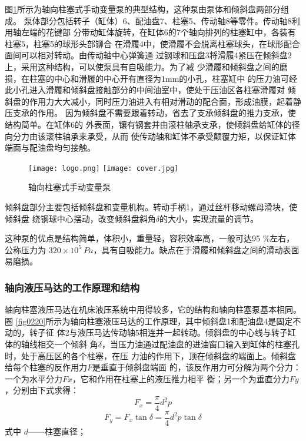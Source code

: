 图\ref{fig0219}所示为轴向柱塞式手动变量泵的典型结构，这种泵由泵体和倾斜盘两部分组成。
泵体部分包括转子（缸体）6、配油盘7、柱塞5、传动轴8等零件。传动轴8利用轴左端的花键部
分带动缸体旋转，在缸体6的7个轴向排列的柱塞缸中，各装有柱塞5，柱塞5的球形头部铆合
在滑履4中，使滑履不会脱离柱塞球头，在球形配合面间可以相对转动。由传动轴中心弹簧通
过钢球和压盘3将滑履4紧压在倾斜盘2上，采用这种结构，可以使泵具有自吸能力。为了减
少滑履和倾斜盘之间的磨损，在柱塞的中心和滑履的中心开有直径为1mm的小孔，柱塞缸中
的压力油可经此小孔进入滑履和倾斜盘接触部分的中间油室中，使处于压油区各柱塞滑履对
倾斜盘的作用力大大减小，同时压力油进入有相对滑动的配合面，形成油膜，起着静压支承的作用。
因为倾斜盘不需要跟着转动，省去了支承倾斜盘的推力支承，使结构简单。在缸体6的
外表面，镶有钢套并由滚柱轴承支承，使倾斜盘给缸体的径向分力由该滚柱轴承来承受，从而
使传动轴和缸体不承受颠覆力矩，以保证缸体端面与配油盘均匀接触。

\begin{figure}[!htb]\centering
    \ifOpenSource
    \texttt{[image: logo.png]}
    \else
    \texttt{[image: cover.jpg]}
    \fi
    \caption{轴向柱塞式手动变量泵}
    \label{fig0219}
\end{figure}


倾斜盘部分主要包括倾斜盘和变量机构。转动手柄1，通过丝杆移动螺母滑块，使倾斜盘
绕钢球中心摆动，改变倾斜盘斜角$\delta $的大小，实现流量的调节。

这种泵的优点是结构简单，体积小，重量轻，容积效率高，一般可达95 \%左右，公称压力为
$320×10^5\ Pa$，具有自吸能力。缺点在于滑履和倾斜盘之间的滑动表面易磨损。

\subsubsection{轴向液压马达的工作原理和结构}

轴向柱塞液压马达在机床液压系统中用得较多，它的结构和轴向柱塞泵基本相同。圈
\ref{fig0220}所示为轴向柱塞液压马达的工作原理，其中倾斜盘1和配油盘4是固定不动的，转子征
体2与液压马达传动轴5相连并一起转动。倾斜盘的中心线与转子缸体的轴线相交一个倾斜
角$\delta $，当压力油通过配油盘的进油窗口输入到缸体的柱塞孔时，处于高压区的各个柱塞，在压
力油的作用下，顶在倾斜盘的端面上。倾斜盘给每个柱塞的反作用力$F$是垂直于倾斜盘端面
的，该反作用力可分解为两个分力：一个为水平分力$Fx$，它和作用在柱塞上的液压推力相平
衡；另一个为垂直分力$Fy$，分别由下式求得：
$$F_{x}=\frac{\pi }{4}d^2p $$
$$F_{y}=F_{x}\tan \delta =\frac{\pi }{4}d^2p\tan \delta $$
式中  \qquad $d$——柱塞直径；

